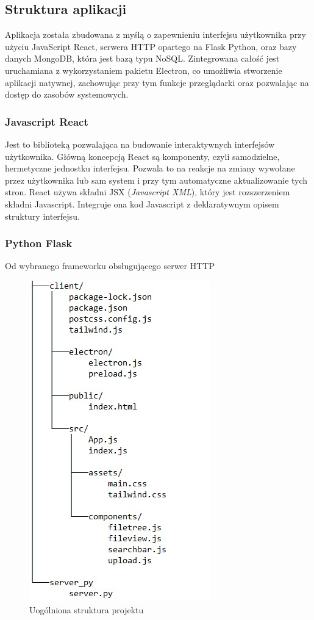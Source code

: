 \documentclass[12pt,a4paper,twoside]{article}
\begin{document}
\subsection{Struktura aplikacji}
Aplikacja została zbudowana z myślą o zapewnieniu interfejsu użytkownika przy użyciu JavaScript React, serwera HTTP opartego na Flask Python, oraz bazy danych MongoDB, która jest bazą typu NoSQL. Zintegrowana całość jest uruchamiana z wykorzystaniem pakietu Electron, co umożliwia stworzenie aplikacji natywnej, zachowując przy tym funkcje przeglądarki oraz pozwalając na dostęp do zasobów systemowych.
\subsubsection*{Javascript React}
Jest to biblioteką pozwalająca na budowanie interaktywnych interfejsów użytkownika. Główną koncepcją React są komponenty, czyli samodzielne, hermetyczne jednostku interfejsu. Pozwala to na reakcje na zmiany wywołane przez użytkownika lub sam system i przy tym automatyczne aktualizowanie tych stron. React używa składni JSX (\textit{Javascript XML}), który jest rozszerzeniem składni Javascript. Integruje ona kod Javascript z deklaratywnym opisem struktury interfejsu.
\subsubsection*{Python Flask}
Od wybranego frameworku obsługującego serwer HTTP 
\begin{figure}[h!]
\centering
  \includegraphics{img/file_structure.jpg}
  \caption{Uogólniona struktura projektu}
\end{figure}
\newpage
\end{document}
